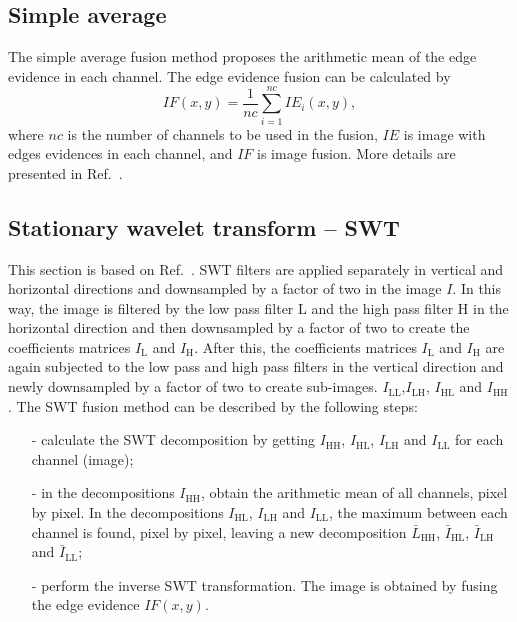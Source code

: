 \documentclass[conference]{IEEEtran}
\begin{document}
\subsection{Simple average}
The simple average fusion method proposes the arithmetic mean of the edge evidence in each channel. 
The edge evidence fusion can be calculated by
\begin{equation}
	IF(x,y)=\frac{1}{nc}\sum_{i=1}^{nc}IE_i(x,y),
\end{equation} 
where $nc$ is the number of channels to be used in the fusion, $IE$ is image with edges evidences in each channel, and $IF$ is image fusion.
More details are presented in Ref.~\cite{mit}.

\subsection{Stationary wavelet transform -- SWT} 

This section is based on Ref.~\cite{n_r}. SWT filters are applied separately in vertical and horizontal directions and downsampled by a factor of two in the image $I$. In this way, the image is filtered by the low pass filter $\text{L}$ and the high pass filter $\text{H}$ in the horizontal direction and then downsampled by a factor of two to create the coefficients matrices $I_\text{L}$ and $I_\text{H}$. After this, the coefficients matrices $I_\text{L}$ and $I_\text{H}$ are again subjected to the low pass and high pass filters in the vertical direction and newly downsampled by a factor of two to create sub-images. $ I_\text{LL}$,$I_\text{LH}$, $I_\text{HL}$ and $I_\text{HH}$.
The SWT fusion method can be described by the following steps:
\begin{itemize}
\item[-] calculate the SWT decomposition by getting $I_\text{HH}$, $I_\text{HL}$, $I_\text{LH}$ and $I_\text{LL}$ for each channel (image); %
\item[-] in the decompositions $I_\text{HH}$, obtain the arithmetic mean of all channels, pixel by pixel. In the decompositions $I_\text{HL}$, $I_\text{LH}$ and $I_\text{LL}$, the maximum between each channel is found, pixel by pixel, leaving a new decomposition $\bar{L}_\text{HH}$, $\bar{I}_\text{HL}$, $\bar{I}_\text{LH}$ and $\bar{I}_\text{LL}$;
\item[-] perform the inverse SWT transformation. The image is obtained by fusing the edge evidence $IF(x,y)$.  
\end{itemize}
\end{document}
